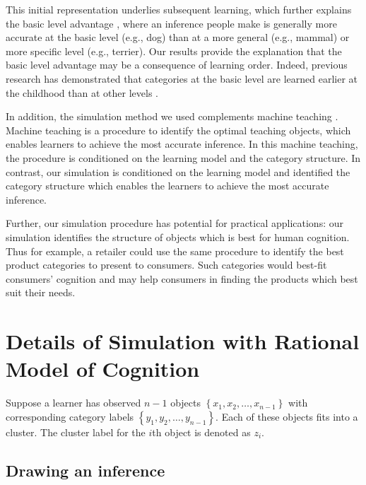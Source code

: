 \documentclass[doc]{apa6}
\begin{document}
This initial representation underlies subsequent learning, which further explains the basic level
advantage \parencite{Mervis1981a, Rosch1976a}, where an inference people make is generally more
accurate at the basic level (e.g., dog) than at a more general (e.g., mammal) or more specific level
(e.g., terrier). Our results provide the explanation that the basic level advantage may be a
consequence of learning order. Indeed, previous research has demonstrated that categories at the
basic level are learned earlier at the childhood than at other levels \parencite{Berlin1973a,
Brown1958a, Horton1980a, Mervis1982a}.

In addition, the simulation method we used complements machine teaching \parencite{Zhu2013a}. Machine
teaching is a procedure to identify the optimal teaching objects, which enables learners to achieve
the most accurate inference. In this machine teaching, the procedure is conditioned on the learning
model and the category structure. In contrast, our simulation is conditioned on the learning model
and identified the category structure which enables the learners to achieve the most accurate
inference.

Further, our simulation procedure has potential for practical applications: our simulation
identifies the structure of objects which is best for human cognition. Thus for example, a retailer
could use the same procedure to identify the best product categories to present to consumers. Such
categories would best-fit consumers' cognition and may help consumers in finding the products which
best suit their needs.


\printbibliography{}

\appendix

\section{Details of Simulation with Rational Model of Cognition}
\label{appendix:model}

Suppose a learner has observed $n - 1$ objects $\left\{x_{1}, x_{2}, \dots, x_{n - 1}\right\}$ with
corresponding category labels $\left\{y_{1}, y_{2}, \dots, y_{n - 1}\right\}$.  Each of these
objects fits into a cluster. The cluster label for the $i$th object is denoted as $z_{i}$.

\subsection{Drawing an inference}
\end{document}
